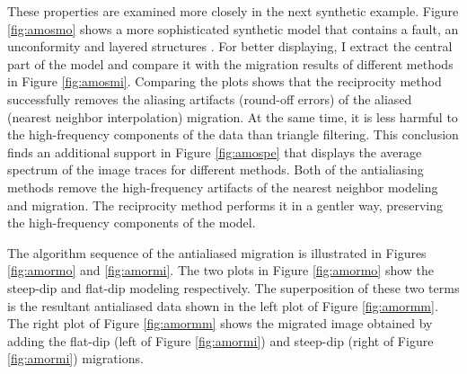 
These properties are examined more closely in the next synthetic
example. Figure \ref{fig:amosmo} shows a more sophisticated synthetic
model that contains a fault, an unconformity and layered structures
\cite{Claerbout.bei.95}. For better displaying, I extract the central
part of the model and compare it with the migration results of
different methods in Figure \ref{fig:amosmi}. Comparing the plots
shows that the reciprocity method successfully removes the aliasing
artifacts (round-off errors) of the aliased (nearest neighbor
interpolation) migration.  At the same time, it is less harmful to the
high-frequency components of the data than triangle filtering. This
conclusion finds an additional support in Figure \ref{fig:amospe} that
displays the average spectrum of the image traces for different
methods. Both of the antialiasing methods remove the high-frequency
artifacts of the nearest neighbor modeling and migration. The
reciprocity method performs it in a gentler way, preserving the
high-frequency components of the model.




The algorithm sequence of the antialiased migration is illustrated in
Figures \ref{fig:amormo} and \ref{fig:amormi}. The two plots in Figure
\ref{fig:amormo} show the steep-dip and flat-dip modeling respectively. The
superposition of these two terms is the resultant antialiased data
shown in the left plot of Figure \ref{fig:amormm}. The right plot of
Figure \ref{fig:amormm} shows the migrated image obtained by adding the
flat-dip (left of Figure \ref{fig:amormi}) and steep-dip (right of Figure
\ref{fig:amormi}) migrations.


